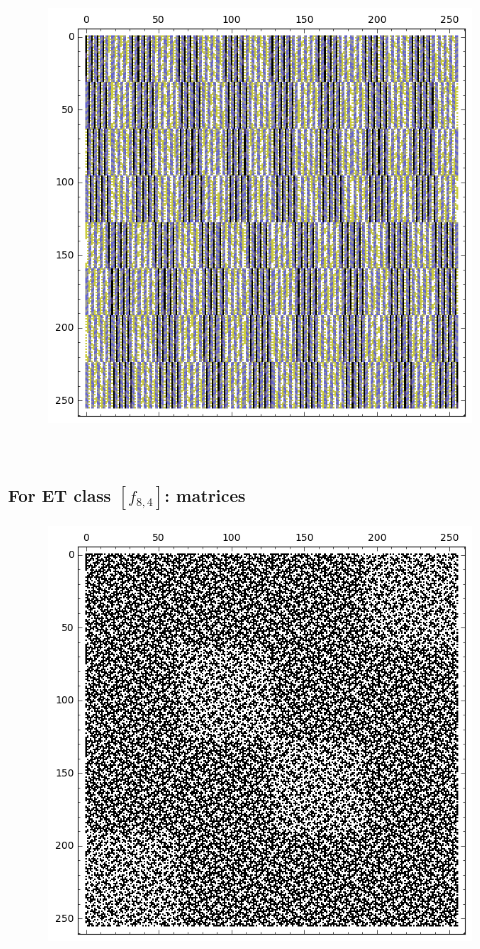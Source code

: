 \documentclass[pdf,sprung,slideColor,nocolorBG]{beamer}
\newenvironment{colortheme}[1]{
\def\ProvidesPackageRCS $##1${\relax}
\renewcommand{\ProcessOptions}{\relax}
\makeatletter

\makeatother
}{}
\begin{document}
\begin{colortheme}{jubata}
\begin{frame}
\begin{figure}
\begin{minipage}{.48\textwidth}
  \label{fig:8_3_weight_class_matrix}
\end{minipage}%
\begin{minipage}{.48\textwidth}
  \centering
  \includegraphics[width=.9\linewidth]{../matrix_plot/re8_3_bent_cayley_graph_index_matrix.png}
  \label{fig:8_3_bent_cayley_graph_index_matrix}
\end{minipage}
\end{figure}
~
\end{frame}
\begin{frame}
\frametitle{For ET class $[f_{8,4}]$: matrices}
\begin{figure}
\centering
\begin{minipage}{.48\textwidth}
  \centering
  \includegraphics[width=.9\linewidth]{../matrix_plot/re8_4_weight_class_matrix.png}

\end{minipage}
\end{figure}
\end{frame}
\end{colortheme}
\end{document}
